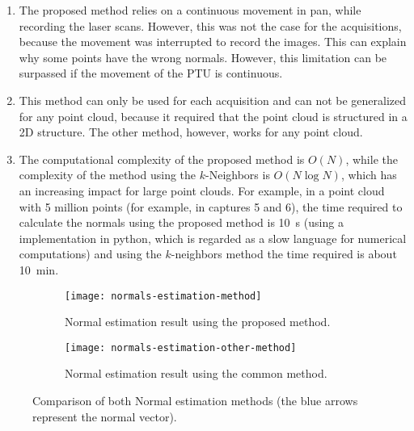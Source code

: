 \begin{enumerate}
    \item The proposed method relies on a continuous movement in pan, while recording the laser scans. However, this was not the case for the acquisitions, because the movement was interrupted to record the images. This can explain why some points have the wrong normals. However, this limitation can be surpassed if the movement of the PTU is continuous.
    \item This method can only be used for each acquisition and can not be generalized for any point cloud, because it required that the point cloud is structured in a 2D structure. The other method, however, works for any point cloud.
    \item The computational complexity of the proposed method is $O(N)$, while the complexity of the method using the $k$-Neighbors is $O(N \log N)$, which has an increasing impact for large point clouds. For example, in a point cloud with 5 million points (for example, in captures 5 and 6), the time required to calculate the normals using the proposed method is \SI{10}{\second} (using a implementation in python, which is regarded as a slow language for numerical computations) and using the $k$-neighbors method the time required is about \SI{10}{\minute}.
\end{enumerate}

\begin{figure}[h]
    
    \centering
    \begin{subfigure}[t]{\textwidth}
        \centering
        \texttt{[image: normals-estimation-method]}
        \caption{Normal estimation result using the proposed method.}
        \label{figure:normals-estimation-method}
    \end{subfigure}

    \begin{subfigure}[t]{\textwidth}
        \centering
        \texttt{[image: normals-estimation-other-method]}
        \caption{Normal estimation result using the common method.}
        \label{figure:normals-estimation-other-method}
    \end{subfigure}

    \caption{Comparison of both Normal estimation methods (the blue arrows represent the normal vector).}
    \label{figure:normal-estimation-results}

\end{figure}

